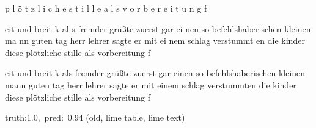 \documentclass[a4paper,10pt,twoside]{article}
\begin{document}
{\color[rgb]{0.0,0,0} p}{\color[rgb]{0.0,0,0} l}{\color[rgb]{0.001,0,0} ö}{\color[rgb]{0.0,0,0} t}{\color[rgb]{0.001,0,0} z}{\color[rgb]{0.001,0,0} l}{\color[rgb]{0.0,0,0} i}{\color[rgb]{0.0,0,0} c}{\color[rgb]{0.0,0,0} h}{\color[rgb]{0.001,0,0} e} {\color[rgb]{0.006,0,0} s}{\color[rgb]{0.003,0,0} t}{\color[rgb]{0.003,0,0} i}{\color[rgb]{0.007,0,0} l}{\color[rgb]{0.006,0,0} l}{\color[rgb]{0.003,0,0} e} {\color[rgb]{0.004,0,0} a}{\color[rgb]{0.006,0,0} l}{\color[rgb]{0.003,0,0} s} {\color[rgb]{0.016,0,0} v}{\color[rgb]{0.002,0,0} o}{\color[rgb]{0.012,0,0} r}{\color[rgb]{0.016,0,0} b}{\color[rgb]{0.015,0,0} e}{\color[rgb]{0.011,0,0} r}{\color[rgb]{0.013,0,0} e}{\color[rgb]{0.023,0,0} i}{\color[rgb]{0.007,0,0} t}{\color[rgb]{0.018,0,0} u}{\color[rgb]{0.01,0,0} n}{\color[rgb]{0.006,0,0} g} {\color[rgb]{0.0,0,0} f}

eit und breit k al{\color[rgb]{1,0,0} s} fremder grüßte zuerst gar ei{\color[rgb]{1,0,0} n}en so befehlshaberischen kleinen ma{\color[rgb]{0,0,1} n}n guten tag herr lehrer sagte er mit ei{\color[rgb]{1,0,0} n}em schlag verstummt{\color[rgb]{0,0,1} e}n die kinder diese plötzliche stille als vorbereitung f

 eit {\color[rgb]{0,0,0.297} und} {\color[rgb]{0.676,0,0} breit} k als fremder {\color[rgb]{0.239,0,0} grüßte} zuerst gar einen {\color[rgb]{0.205,0,0} so} {\color[rgb]{0.241,0,0} befehlshaberischen} kleinen mann guten tag herr lehrer sagte er mit einem schlag verstummten die kinder diese plötzliche stille als vorbereitung f

 {\footnotesize {\color[rgb]{0.6, 0.6, 0.6}truth:1.0,~pred:~0.94}} (old, lime table, lime text)\hrulefill
\end{document}
